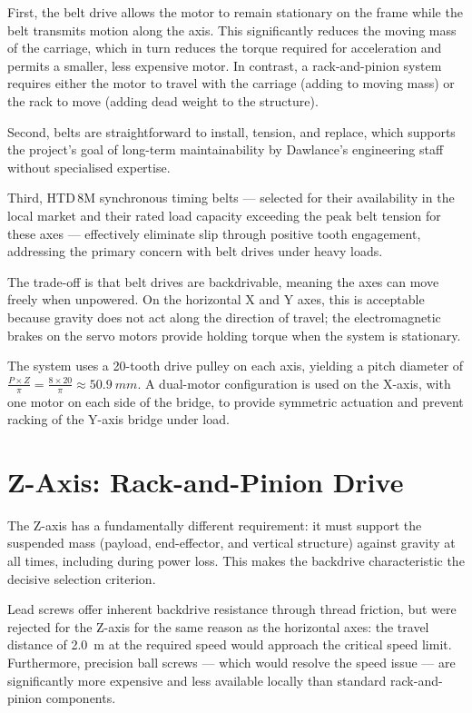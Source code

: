First, the belt drive allows the motor to remain stationary on the frame while the belt transmits motion along the axis. This significantly reduces the moving mass of the carriage, which in turn reduces the torque required for acceleration and permits a smaller, less expensive motor. In contrast, a rack-and-pinion system requires either the motor to travel with the carriage (adding to moving mass) or the rack to move (adding dead weight to the structure).

Second, belts are straightforward to install, tension, and replace, which supports the project's goal of long-term maintainability by Dawlance's engineering staff without specialised expertise.

Third, HTD\,8M synchronous timing belts --- selected for their availability in the local market and their rated load capacity exceeding the peak belt tension for these axes --- effectively eliminate slip through positive tooth engagement, addressing the primary concern with belt drives under heavy loads.

The trade-off is that belt drives are backdrivable, meaning the axes can move freely when unpowered. On the horizontal X and Y axes, this is acceptable because gravity does not act along the direction of travel; the electromagnetic brakes on the servo motors provide holding torque when the system is stationary.

The system uses a 20-tooth drive pulley on each axis, yielding a pitch diameter of $\frac{P \times Z}{\pi} = \frac{8 \times 20}{\pi} \approx \qty{50.9}{mm}$. A dual-motor configuration is used on the X-axis, with one motor on each side of the bridge, to provide symmetric actuation and prevent racking of the Y-axis bridge under load.

\section{Z-Axis: Rack-and-Pinion Drive}

The Z-axis has a fundamentally different requirement: it must support the suspended mass (payload, end-effector, and vertical structure) against gravity at all times, including during power loss. This makes the backdrive characteristic the decisive selection criterion.

Lead screws offer inherent backdrive resistance through thread friction, but were rejected for the Z-axis for the same reason as the horizontal axes: the travel distance of \qty{2.0}{m} at the required speed would approach the critical speed limit. Furthermore, precision ball screws --- which would resolve the speed issue --- are significantly more expensive and less available locally than standard rack-and-pinion components.

